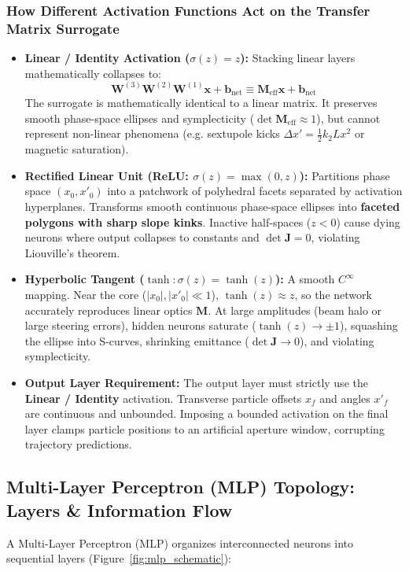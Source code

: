 \documentclass[11pt,a4paper]{article}
\begin{document}
\subsubsection{How Different Activation Functions Act on the Transfer Matrix Surrogate}
\begin{itemize}
    \item \textbf{Linear / Identity Activation ($\sigma(z) = z$):} Stacking linear layers mathematically collapses to:
    \begin{equation}
        \mathbf{W}^{(3)}\mathbf{W}^{(2)}\mathbf{W}^{(1)}\mathbf{x} + \mathbf{b}_{\text{net}} \equiv \mathbf{M}_{\text{eff}}\mathbf{x} + \mathbf{b}_{\text{net}}
    \end{equation}
    The surrogate is mathematically identical to a linear matrix. It preserves smooth phase-space ellipses and symplecticity ($\det \mathbf{M}_{\text{eff}} \approx 1$), but cannot represent non-linear phenomena (e.g. sextupole kicks $\Delta x' = \frac{1}{2} k_2 L x^2$ or magnetic saturation).
    \item \textbf{Rectified Linear Unit (ReLU: $\sigma(z) = \max(0, z)$):} Partitions phase space $(x_0, x'_0)$ into a patchwork of polyhedral facets separated by activation hyperplanes. Transforms smooth continuous phase-space ellipses into \textbf{faceted polygons with sharp slope kinks}. Inactive half-spaces ($z < 0$) cause dying neurons where output collapses to constants and $\det \mathbf{J} = 0$, violating Liouville's theorem.
    \item \textbf{Hyperbolic Tangent ($\tanh: \sigma(z) = \tanh(z)$):} A smooth $C^\infty$ mapping. Near the core ($|x_0|, |x'_0| \ll 1$), $\tanh(z) \approx z$, so the network accurately reproduces linear optics $\mathbf{M}$. At large amplitudes (beam halo or large steering errors), hidden neurons saturate ($\tanh(z) \to \pm 1$), squashing the ellipse into S-curves, shrinking emittance ($\det \mathbf{J} \to 0$), and violating symplecticity.
    \item \textbf{Output Layer Requirement:} The output layer must strictly use the \textbf{Linear / Identity} activation. Transverse particle offsets $x_f$ and angles $x'_f$ are continuous and unbounded. Imposing a bounded activation on the final layer clamps particle positions to an artificial aperture window, corrupting trajectory predictions.
\end{itemize}

\subsection{Multi-Layer Perceptron (MLP) Topology: Layers \& Information Flow}
A Multi-Layer Perceptron (MLP) organizes interconnected neurons into sequential layers (Figure~\ref{fig:mlp_schematic}):
\end{document}
